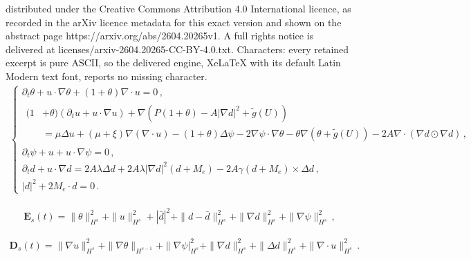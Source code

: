 \documentclass[10pt,a4paper]{amsart}
\def\p{\partial}
\begin{document}
distributed under the Creative Commons Attribution 4.0 International licence, as recorded in the arXiv licence metadata for this exact version and shown on the abstract page https://arxiv.org/abs/2604.20265v1. A full rights notice is delivered at licenses/arxiv-2604.20265-CC-BY-4.0.txt. Characters: every retained excerpt is pure ASCII, so the delivered engine, XeLaTeX with its default Latin Modern text font, reports no missing character.
\begin{align}\label{CMEH-eqGd}
	\begin{cases}
		\p_t \theta +u\cdot\nabla\theta+(1+\theta)\nabla\cdot u = 0 \,, \\
		\begin{aligned}
			(1&+\theta)(\p_t u+u\cdot\nabla u) + \nabla \left( P(1+\theta) - A |\nabla d|^2 +\tilde{g}(U)\right) 
			\\[5pt] & 
			=  \mu\Delta u+(\mu+\xi)\nabla(\nabla \cdot u)-(1+\theta)\Delta\psi-2\nabla\psi\cdot\nabla\theta-\theta\nabla(\theta+\tilde{g}(U))-2A \nabla \cdot ( \nabla d \odot \nabla d)  \,, 
		\end{aligned} \\
		\partial_t \psi + u+u\cdot\nabla \psi =0 \,, \\
		\p_t d + u\cdot \nabla d = 2A\lambda \Delta d+2A\lambda|\nabla d|^2(d+M_e)-2A\gamma(d+M_e)\times \Delta d
		\,, \\ 
	|d|^2+2M_e\cdot d=0 \,. 
	\end{cases}
\end{align}

\begin{equation}\label{close-eq5-1}
\begin{aligned}
\mathbf{E}_s (t) = \| \theta \|^2_{H^s} + \| u \|^2_{H^s} + | \bar{d} |^2 + \| d -\bar{d} \|^2_{H^s} + \| \nabla d \|^2_{H^s} + \| \nabla \psi \|^2_{H^s} \,,
\end{aligned}
\end{equation}

\begin{equation}\label{close-eq6-1}
\begin{aligned}
\mathbf{D}_s (t) = \| \nabla u \|^2_{H^s} + \| \nabla \theta \|_{H^{s-1}} + \| \nabla \psi |^2_{H^s} + \| \nabla d \|^2_{H^s} + \| \Delta d \|^2_{H^s} + \| \nabla \cdot u \|^2_{H^s} \,.
\end{aligned}
\end{equation}
\end{document}
